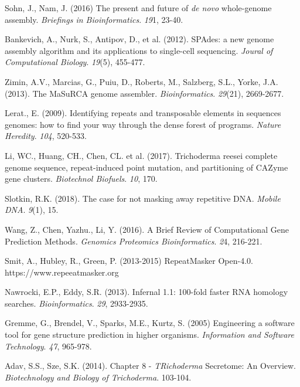 \documentclass[12pt]{article}
\begin{document}
\begin{thebibliography}{99}
 Sohn, J., Nam, J. (2016) The present and future of
  \textit{de novo} whole-genome assembly. \textit{Briefings in
    Bioinformatics}. \textit{19}1, 23-40.

 Bankevich, A., Nurk, S., Antipov, D., et
  al. (2012). SPAdes: a new genome assembly algorithm and its
  applications to single-cell sequencing. \textit{Joural of
    Computational Biology}. \textit{19}(5), 455-477. 
  
 Zimin, A.V., Marcias, G., Puiu, D., Roberts, M.,
  Salzberg, S.L., Yorke, J.A. (2013). The MaSuRCA genome
  assembler. \textit{Bioinformatics}. \textit{29}(21), 2669-2677.
  
 Lerat., E. (2009). Identifying repeats and
  transposable elements in sequences genomes: how to find your way
  through the dense forest of programs. \textit{Nature
    Heredity}. \textit{104}, 520-533.

 Li, WC., Huang, CH., Chen, CL. et
  al. (2017). Trichoderma reesei complete genome sequence,
  repeat-induced point mutation, and partitioning of CAZyme gene
  clusters. \textit{Biotechnol Biofuels}. \textit{10}, 170.

 Slotkin, R.K. (2018). The case for not masking away
  repetitive DNA. \textit{Mobile DNA}. \textit{9}(1), 15.
  
 Wang, Z., Chen, Yazhu., Li, Y. (2016). A Brief
  Review of Computational Gene Prediction Methods. \textit{Genomics
    Proteomics Bioinformatics}. \textit{2}4, 216-221.

 Smit, A., Hubley, R., Green, P. (2013-2015)
  RepeatMasker Open-4.0. https://www.repeeatmasker.org

 Nawrocki, E.P., Eddy, S.R. (2013). Infernal 1.1:
  100-fold faster RNA homology
  searches. \textit{Bioinformatics}. \textit{29}, 2933-2935.

 Gremme, G., Brendel, V., Sparks, M.E., Kurtz,
  S. (2005) Engineering a software tool for gene structure prediction
  in higher organisms. \textit{Information and Software
    Technology}. \textit{47}, 965-978.

 Adav, S.S., Sze, S.K. (2014). Chapter 8 -
  \textit{TRichoderma} Secretome: An Overview. \textit{Biotechnology
    and Biology of Trichoderma}. 103-104. 
  
\end{thebibliography}
\end{document}

